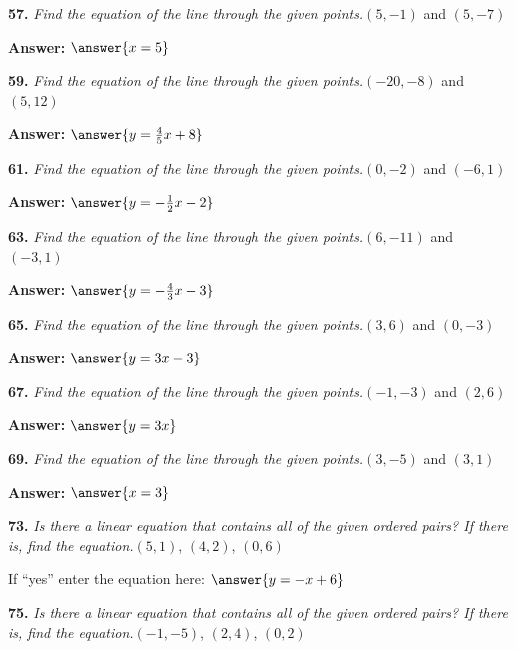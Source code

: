 \documentclass{ximera}
\begin{document}
\begin{problem}
\textbf{57.} \emph{Find the equation of the line through the given points.}\quad $(5, -1)$ and $(5, -7)$

\textbf{Answer:} $\answer{x = 5}$
\end{problem}

\begin{problem}
\textbf{59.} \emph{Find the equation of the line through the given points.}\quad $(-20, -8)$ and $(5, 12)$

\textbf{Answer:} $\answer{y = \frac{4}{5}x +8}$
\end{problem}

\begin{problem}
\textbf{61.} \emph{Find the equation of the line through the given points.}\quad $(0, -2)$ and $(-6, 1)$

\textbf{Answer:} $\answer{y = -\frac{1}{2}x -2}$
\end{problem}

\begin{problem}
\textbf{63.} \emph{Find the equation of the line through the given points.}\quad $(6, -11)$ and $(-3, 1)$

\textbf{Answer:} $\answer{y = -\frac{4}{3}x -3}$
\end{problem}

\begin{problem}
\textbf{65.} \emph{Find the equation of the line through the given points.}\quad $(3, 6)$ and $(0, -3)$

\textbf{Answer:} $\answer{y = 3x -3}$
\end{problem}

\begin{problem}
\textbf{67.} \emph{Find the equation of the line through the given points.}\quad $(-1, -3)$ and $(2, 6)$

\textbf{Answer:} $\answer{y = 3x}$
\end{problem}

\begin{problem}
\textbf{69.} \emph{Find the equation of the line through the given points.}\quad $(3, -5)$ and $(3, 1)$

\textbf{Answer:} $\answer{x = 3}$
\end{problem}

\begin{problem}
\textbf{73.} \emph{Is there a linear equation that contains all of the given ordered pairs? If there is, find the equation.}\quad $(5, 1)$, $(4, 2)$, $(0, 6)$

\begin{multipleChoice}
\end{multipleChoice}

If ``yes'' enter the equation here: $\answer{y = -x +6}$
\end{problem}

\begin{problem}
\textbf{75.} \emph{Is there a linear equation that contains all of the given ordered pairs? If there is, find the equation.}\quad $(-1, -5)$, $(2, 4)$, $(0, 2)$

\begin{multipleChoice}
\end{multipleChoice}

\end{problem}
\end{document}
